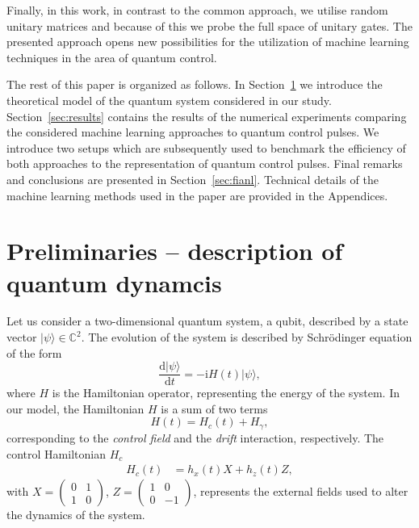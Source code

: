 \documentclass[aps,pra,showkeys,showpacs,notitlepage,superscriptaddress]{revtex4-1}
\newcommand{\ket}[1]{\ensuremath{|#1\rangle}}
\newcommand{\1}{{\rm 1\hspace{-0.9mm}l}}
\newcommand{\ii}{\mathrm{i}}
\newcommand{\dd}{\mathrm{d}}
\newcommand{\Cplx}{\mathbb{C}}
\newcommand{\Sx}{X}
\newcommand{\Sz}{Z}
\begin{document}
Finally, in this work, in contrast to the common 
approach, we utilise random unitary matrices and because of this  we probe the 
full space of unitary gates. The presented approach opens new possibilities for the utilization of machine learning techniques in the area of quantum control.

The rest of this paper is organized as follows. In 
Section~\ref{sec:preliminaries} we introduce the theoretical model of the quantum 
system considered in our study. 
Section~\ref{sec:results} contains the results of the numerical  experiments comparing the considered machine learning approaches to quantum control pulses. We introduce 
two setups which are subsequently used to benchmark the efficiency 
of both approaches to the representation of quantum control pulses. Final 
remarks and conclusions are presented in Section~\ref{sec:fianl}. Technical 
details of the machine learning methods used in the paper are provided in the 
Appendices. 

\section{Preliminaries -- description of quantum dynamcis}
\label{sec:preliminaries}


Let us consider a two-dimensional quantum system, a qubit, described by a state 
vector $\ket{\psi}\in\Cplx^2$. The evolution of the system is described by 
Schr\"odinger equation of the form
\begin{equation}
\frac{\dd\ket{\psi}}{\dd t} =-\ii H(t)\ket{\psi},
\label{eq:schrod}
\end{equation}
where $H$ is the Hamiltonian operator, representing the energy of the system.
In our model, the Hamiltonian $H$ is a sum of two terms
\begin{equation}
H(t) = H_c(t) + H_{\gamma},
\end{equation}
corresponding to the
\emph{control field} and the \emph{drift} interaction, respectively.
The control Hamiltonian $H_c$
\begin{align}
H_c(t) &= h_x(t)\Sx+ h_z(t)\Sz, \label{eq:control_hamiltonian} 
\end{align}
with $\Sx=\left(\begin{smallmatrix}0&1\\1&0\end{smallmatrix}\right)$, 
$\Sz=\left(\begin{smallmatrix}1&0\\0&-1\end{smallmatrix}\right)$,
represents the external fields used to alter the dynamics of the system.
\end{document}

